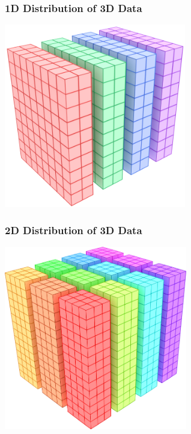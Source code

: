 \documentclass[xcolor={rgb,x11names,svgnames},rgb,x11names,svgnames]{beamer}
\begin{document}

\begin{frame}
\frametitle{1D Distribution of 3D Data}

\centering\includegraphics[height=8cm]{slabs.png}

\end{frame}


\begin{frame}
\frametitle{2D Distribution of 3D Data}

\centering\includegraphics[height=8cm]{pencils.png}

\end{frame}

\end{document}
